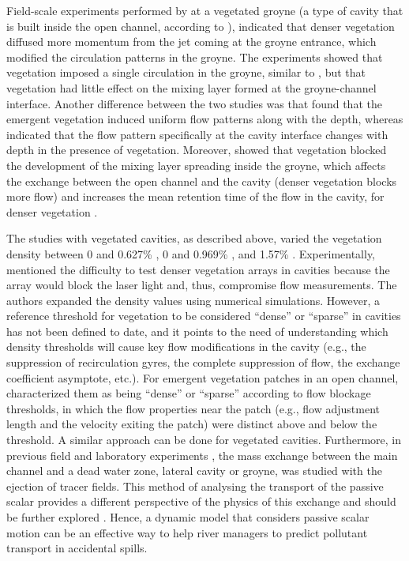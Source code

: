 Field-scale experiments performed by \textcite{sukhodolov2017} at a vegetated groyne (a type of cavity that is built inside the open channel, according to \textcite{jackson2013}), indicated that denser vegetation diffused more momentum from the jet coming at the groyne entrance, which modified the circulation patterns in the groyne. The experiments showed that vegetation imposed a single circulation in the groyne, similar to \textcite{xiang2019}, but that vegetation had little effect on the mixing layer formed at the groyne-channel interface. Another difference between the two studies was that \textcite{sukhodolov2017} found that the emergent vegetation induced uniform flow patterns along with the depth, whereas \textcite{xiang2019} indicated that the flow pattern specifically at the cavity interface changes with depth in the presence of vegetation. Moreover, \textcite{xiang2020} showed that vegetation blocked the development of the mixing layer spreading inside the groyne, which affects the exchange between the open channel and the cavity (denser vegetation blocks more flow) and increases the mean retention time of the flow in the cavity, for denser vegetation \cite{xiang2019}.

The studies with vegetated cavities, as described above, varied the vegetation density between 0 and 0.627\% \cite{xiang2019}, 0 and 0.969\% \cite{xiang2020}, and 1.57\% \cite{sukhodolov2017}. Experimentally, \textcite{xiang2020} mentioned the difficulty to test denser vegetation arrays in cavities because the array would block the laser light and, thus, compromise flow measurements. The authors expanded the density values using numerical simulations. However, a reference threshold for vegetation to be considered “dense” or “sparse” in cavities has not been defined to date, and it points to the need of understanding which density thresholds will cause key flow modifications in the cavity (e.g., the suppression of recirculation gyres, the complete suppression of flow, the exchange coefficient asymptote, etc.). For emergent vegetation patches in an open channel, \textcite{chen2012} characterized them as being “dense” or “sparse” according to flow blockage thresholds, in which the flow properties near the patch (e.g., flow adjustment length and the velocity exiting the patch) were distinct above and below the threshold. A similar approach can be done for vegetated cavities. Furthermore, in previous field and laboratory experiments \cite{Mignot2017,Constantinescu2009,weitbrecht2004,weitbrecht2001,Uijttewaal2001}, the mass exchange between the main channel and a dead water zone, lateral cavity or groyne, was studied with the ejection of tracer fields. This method of analysing the transport of the passive scalar provides a different perspective of the physics of this exchange and should be further explored \cite{xiang2019}. Hence, a dynamic model that considers passive scalar motion can be an effective way to help river managers to predict pollutant transport in accidental spills.

